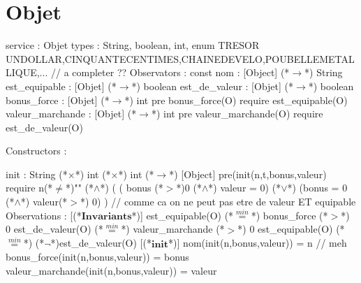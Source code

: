 \documentclass[a4paper, 11pt]{report}
\newcommand{\specB}[1]{\textbf{#1}}
\begin{document}
\section{Objet}
\begin{Spe}


service : Objet 
types : String, boolean, int, enum TRESOR {UNDOLLAR,CINQUANTECENTIMES,CHAINEDEVELO,POUBELLEMETALLIQUE,...} // a completer ??
Observators :
	const nom : [Object] (*$\rightarrow$*) String
	est_equipable : [Objet] (*$\rightarrow$*) boolean 
	est_de_valeur : [Objet] (*$\rightarrow$*) boolean
	bonus_force : [Objet] (*$\rightarrow$*) int
		pre bonus_force(O) require est_equipable(O) 
	valeur_marchande : [Objet] (*$\rightarrow$*) int
		pre valeur_marchande(O) require est_de_valeur(O)

Constructors :

	init : String (*$\times$*) int (*$\times$*) int (*$\rightarrow$*) [Object] 
		pre(init(n,t,bonus,valeur) require n(*$\ne$*)""
                (*$\land$*) ( ( bonus (*$>$*)0 (*$\land$*) valeur = 0)
                (*$\lor$*) (bonus = 0 (*$\land$*) valeur(*$>$*) 0) ) 
                // comme ca on ne peut pas etre de valeur ET equipable 
Observations : 
        [(*$\specB{Invariants}$*)]
	        est_equipable(O) (*$\stackrel{min}{=}$*) bonus_force (*$>$*) 0
	        est_de_valeur(O) (*$\stackrel{min}{=}$*) valeur_marchande (*$>$*) 0
              	est_equipable(O) (*$\stackrel{min}{=}$*) (*$\lnot$*)est_de_valeur(O)
	[(*$\specB{init}$*)]
		nom(init(n,bonus,valeur)) = n // meh 
		bonus_force(init(n,bonus,valeur)) = bonus 
		valeur_marchande(init(n,bonus,valeur)) = valeur 

\end{Spe}
\end{document}
